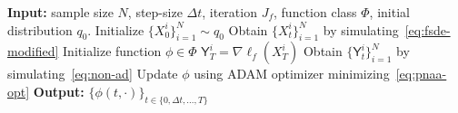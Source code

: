\documentclass[letterpaper, 10 pt, conference]{ieeeconf}  %
\def\argmin{\mathop{\text{\rm arg\,min}}}
\newcommand{\trace}{\text{Tr}}
\def\argmin{\mathop{\text{\rm arg\,min}}}
\newcommand{\Yn}{\mathsf Y}
\begin{document}

\begin{algorithm}[htbp]
\caption{Projected non-adapted adjoint process} 
\begin{algorithmic}[1]
\STATE \textbf{Input:}  sample size $N$, step-size $\Delta t$, iteration $J_f$, function class $\Phi$, initial distribution $q_0$.   
\STATE  Initialize $\{X_0^i\}_{i=1}^N \sim q_0$
\STATE Obtain $\{X_t^i\}_{i=1}^N$ by simulating~\eqref{eq:fsde-modified}
\STATE Initialize function $\phi \in \Phi$
\STATE $\Yn_T^i = \nabla \ell_f (X_T^i)$
\STATE Obtain $\{\Yn_t^i\}_{i=1}^N$ by simulating~\eqref{eq:non-ad}
 \STATE Update $\phi$  using ADAM optimizer minimizing~\eqref{eq:pnaa-opt}
 \STATE \textbf{Output:}  $\{\phi(t,\cdot)\}_{t\in \{0,\Delta t,\ldots,T\} }$
\end{algorithmic}
\label{alg:pnaa}
\end{algorithm}
\end{document}
